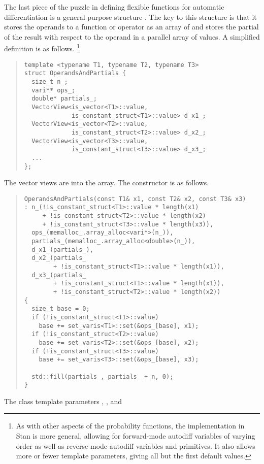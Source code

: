 \documentclass[10pt]{article}
\begin{document}
The last piece of the puzzle in defining flexible functions for
automatic differentiation is a general purpose structure
.  The key to this structure is that it
stores the operands to a function or operator as an array of
 and stores the partial of the result with respect to the
operand in a parallel array of  values.  A simplified
definition is as follows.%
%
\footnote{As with other aspects of the probability functions, the
  implementation in Stan is more general, allowing for forward-mode
  autodiff variables of varying order as well as reverse-mode autodiff
  variables and primitives.  It also allows more or fewer template
  parameters, giving all but the first default  values.}
%
\begin{quote}
\begin{Verbatim}
template <typename T1, typename T2, typename T3>
struct OperandsAndPartials {
  size_t n_;
  vari** ops_;
  double* partials_;
  VectorView<is_vector<T1>::value, 
             is_constant_struct<T1>::value> d_x1_;
  VectorView<is_vector<T2>::value, 
             is_constant_struct<T2>::value> d_x2_;
  VectorView<is_vector<T3>::value, 
             is_constant_struct<T3>::value> d_x3_;
  ...
};
\end{Verbatim}
\end{quote}
%
The vector views are into the  array.  The constructor
is as follows.
%
\begin{quote}
\begin{Verbatim}
OperandsAndPartials(const T1& x1, const T2& x2, const T3& x3)
: n_(!is_constant_struct<T1>::value * length(x1)
     + !is_constant_struct<T2>::value * length(x2)
     + !is_constant_struct<T3>::value * length(x3)),
  ops_(memalloc_.array_alloc<vari*>(n_)),
  partials_(memalloc_.array_alloc<double>(n_)),
  d_x1_(partials_),
  d_x2_(partials_
        + !is_constant_struct<T1>::value * length(x1)),
  d_x3_(partials_
        + !is_constant_struct<T1>::value * length(x1)),
        + !is_constant_struct<T2>::value * length(x2)) 
{ 
  size_t base = 0;
  if (!is_constant_struct<T1>::value)
    base += set_varis<T1>::set(&ops_[base], x1);
  if (!is_constant_struct<T2>::value)
    base += set_varis<T2>::set(&ops_[base], x2);
  if (!is_constant_struct<T3>::value)
    base += set_varis<T3>::set(&ops_[base], x3);

  std::fill(partials_, partials_ + n, 0);
}
\end{Verbatim}
\end{quote}
%
The class template parameters , , and 
\end{document}
